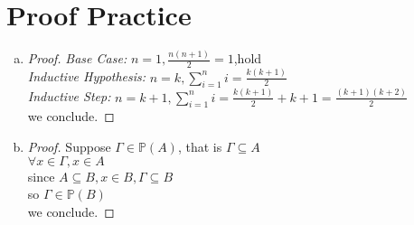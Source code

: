 \documentclass{article}
\newcommand{\powerset}[1]{\mathbb{P}(#1)}
\begin{document}
    \part*{Proof Practice}
    \begin{enumerate}[(a).]
        \item \begin{proof}
        
            \emph{Base Case: }$n=1,\frac{n(n+1)}{2}=1$,hold\\
            \emph{Inductive Hypothesis: }
            $n=k,\sum_{i=1}^{n}i=\frac{k(k+1)}{2}$\\
            \emph{Inductive Step: }
            $n=k+1,\sum_{i=1}^{n}i=\frac{k(k+1)}{2}+k+1=\frac{(k+1)(k+2)}{2}$\\
            we conclude.
        \end{proof}
        
        \item \begin{proof}
        
            Suppose $\Gamma \in \powerset{A}$, that is $\Gamma \subseteq A$\\
            $\forall x \in \Gamma, x \in A$\\
            since $A \subseteq B, x \in B, \Gamma \subseteq B$\\
            so $\Gamma \in \powerset{B}$\\
            we conclude.
            
        \end{proof}
    \end{enumerate}
\end{document}

